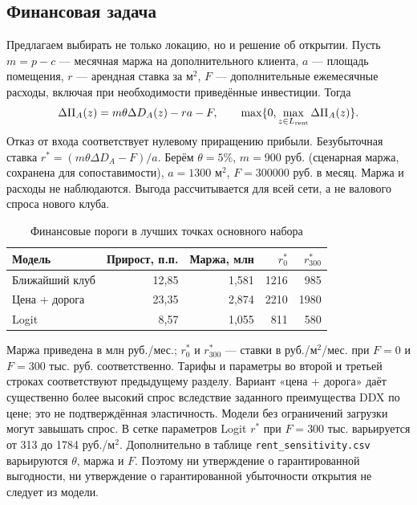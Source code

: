 \documentclass[12pt,a4paper]{article}
\begin{document}
\subsection{Финансовая задача}
Предлагаем выбирать не только локацию, но и решение об открытии. Пусть $m=p-c$ --- месячная маржа на дополнительного клиента, $a$ --- площадь помещения, $r$ --- арендная ставка за м$^2$, $F$ --- дополнительные ежемесячные расходы, включая при необходимости приведённые инвестиции. Тогда
\begin{equation}
 \Delta\Pi_A(z)=m\theta\Delta D_A(z)-ra-F,\qquad \max\{0,\max_{z\in L_{\rm rent}}\Delta\Pi_A(z)\}.
\end{equation}
Отказ от входа соответствует нулевому приращению прибыли. Безубыточная ставка $r^*=(m\theta\Delta D_A-F)/a$. Берём $\theta=5\%$, $m=900$ руб. (сценарная маржа, сохранена для сопоставимости), $a=1300$ м$^2$, $F=300000$ руб. в месяц. Маржа и расходы не наблюдаются. Выгода рассчитывается для всей сети, а не валового спроса нового клуба.
\begin{table}[H]\centering\caption{Финансовые пороги в лучших точках основного набора}\small\begin{tabularx}{\linewidth}{Yrrrr}\toprule Модель & Прирост, п.п. & Маржа, млн & $r^*_0$ & $r^*_{300}$\\\midrule Ближайший клуб & 12,85 & 1,581 & 1216 & 985\\ Цена + дорога & 23,35 & 2,874 & 2210 & 1980\\ Logit & 8,57 & 1,055 & 811 & 580\\\bottomrule\end{tabularx}\end{table}
Маржа приведена в млн руб./мес.; $r^*_0$ и $r^*_{300}$ --- ставки в руб./м$^2$/мес. при $F=0$ и $F=300$ тыс. руб. соответственно. Тарифы и параметры во второй и третьей строках соответствуют предыдущему разделу. Вариант «цена + дорога» даёт существенно более высокий спрос вследствие заданного преимущества DDX по цене; это не подтверждённая эластичность. Модели без ограничений загрузки могут завышать спрос. В сетке параметров Logit $r^*$ при $F=300$ тыс. варьируется от 313 до 1784 руб./м$^2$. Дополнительно в таблице \texttt{rent\_sensitivity.csv} варьируются $\theta$, маржа и $F$. Поэтому ни утверждение о гарантированной выгодности, ни утверждение о гарантированной убыточности открытия не следует из модели.
\end{document}

